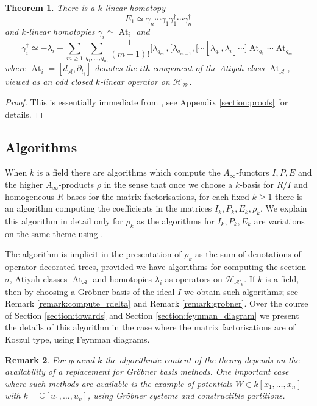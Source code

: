 \documentclass[english,letter paper,12pt,leqno]{article}
\newtheorem{theorem}{Theorem}[section]
\theoremstyle{example}
\newtheorem{remark}[theorem]{Remark}
\numberwithin{equation}{section}
\def\AA{\mathcal{A}}
\def\BB{\mathcal{B}}
\def\HH{\HH}
\def\HH{\mathcal{H}}
\def\be{\begin{equation}}
\def\ee{\end{equation}}
\DeclareMathOperator{\At}{At}
\DeclareMathOperator{\vAt}{At}
\begin{document}
\begin{theorem}\label{theorem:homotopy_clifford} There is a $k$-linear homotopy
\be
E_1 \simeq \gamma_n \cdots \gamma_1 \gamma_1^\dagger \cdots \gamma_n^\dagger
\ee
and $k$-linear homotopies $\gamma_i \simeq \vAt_i$ and
\be
\gamma_i^\dagger \simeq -\lambda_i - \sum_{m \ge 1} \sum_{q_1,\ldots,q_m} \frac{1}{(m+1)!} \big[ \lambda_{q_m}\,, \big[ \lambda_{q_{m-1}}, \big[ \cdots [ \lambda_{q_1}, \lambda_i ] \cdots \big] \At_{q_1} \cdots \At_{q_m}
\ee
where $\vAt_i = [ d_{\AA}, \partial_{t_i} ]$ denotes the $i$th component of the Atiyah class $\vAt_{\AA}$, viewed as an odd closed $k$-linear operator on $\HH_{\BB'}$.
\end{theorem}
\begin{proof}
This is essentially immediate from \cite{cut}, see Appendix \ref{section:proofs} for details.
\end{proof}

\subsection{Algorithms}\label{section:the_algorithms}

When $k$ is a field there are algorithms which compute the $A_\infty$-functors $I, P, E$ and the higher $A_\infty$-products $\rho$ in the sense that once we choose a $k$-basis for $R/I$ and homogeneous $R$-bases for the matrix factorisations, for each fixed $k \ge 1$ there is an algorithm computing the coefficients in the matrices $I_k, P_k, E_k, \rho_k$. We explain this algorithm in detail only for $\rho_k$ as the algorithms for $I_k, P_k, E_k$ are variations on the same theme using \cite{markl_transfer}.

The algorithm is implicit in the presentation of $\rho_k$ as the sum of denotations of operator decorated trees, provided we have algorithms for computing the section $\sigma$, Atiyah classes $\vAt_{\AA}$ and homotopies $\lambda_i$ as operators on $\HH_{\AA'_\theta}$. If $k$ is a field, then by choosing a Gr\"obner basis of the ideal $I$ we obtain such algorithms; see Remark \ref{remark:compute_rdelta} and Remark \ref{remark:grobner}. Over the course of Section \ref{section:towards} and Section \ref{section:feynman_diagram} we present the details of this algorithm in the case where the matrix factorisations are of Koszul type, using Feynman diagrams.

\begin{remark} For general $k$ the algorithmic content of the theory depends on the availability of a replacement for Gr\"obner basis methods. One important case where such methods are available is the example of potentials $W \in k[x_1,\ldots,x_n]$ with $k = \mathbb{C}[u_1,\ldots,u_v]$, using Gr\"obner systems \cite{weispfenning} and constructible partitions.
\end{remark}
\end{document}
